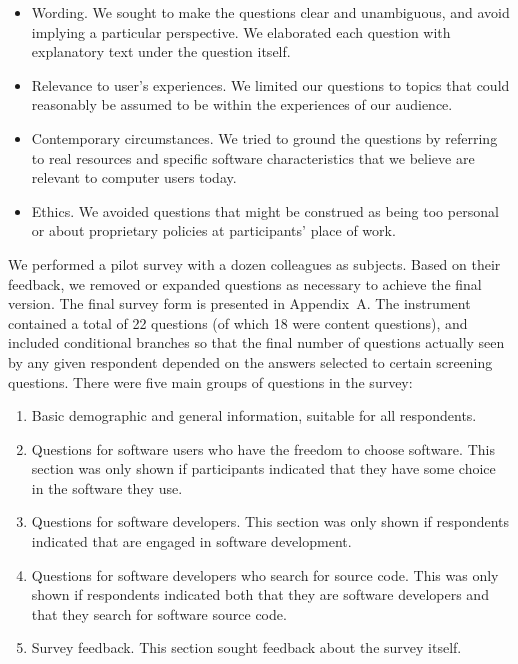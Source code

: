 \documentclass[review]{elsarticle}
\begin{document}
\begin{itemize}

\item Wording.  We sought to make the questions clear and unambiguous, and avoid implying a particular perspective.  We elaborated each question with explanatory text under the question itself.

\item Relevance to user's experiences.  We limited our questions to topics that could reasonably be assumed to be within the experiences of our audience.

\item Contemporary circumstances.  We tried to ground the questions by referring to real resources and specific software characteristics that we believe are relevant to computer users today.

\item Ethics.  We avoided questions that might be construed as being too personal or about proprietary policies at participants' place of work.

\end{itemize}

We performed a pilot survey with a dozen colleagues as subjects.  Based on their feedback, we removed or expanded questions as necessary to achieve the final version.  The final survey form is presented in Appendix~A.  The instrument contained a total of 22 questions (of which 18 were content questions), and included conditional branches so that the final number of questions actually seen by any given respondent depended on the answers selected to certain screening questions.  There were five main groups of questions in the survey:

\begin{enumerate}

\item Basic demographic and general information, suitable for all respondents.

\item Questions for software users who have the freedom to choose software.  This section was only shown if participants indicated that they have some choice in the software they use.

\item Questions for software developers.  This section was only shown if respondents indicated that are engaged in software development.

\item Questions for software developers who search for source code.  This was only shown if respondents indicated both that they are software developers and that they search for software source code.

\item Survey feedback.  This section sought feedback about the survey itself.

\end{enumerate}
\end{document}
